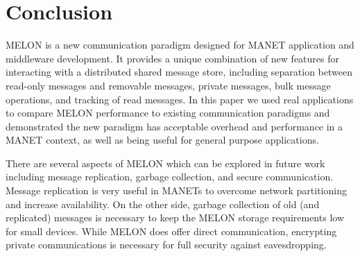 \documentclass[lnicst]{svmultln}
\begin{document}
\section{Conclusion}\label{sec:conclusion}

MELON is a new communication paradigm designed for MANET application and middleware development. It provides a unique combination of new features for interacting with a distributed shared message store, including separation between read-only messages and removable messages, private messages, bulk message operations, and tracking of read messages. In this paper we used real applications to compare MELON performance to existing communication paradigms and demonstrated the new paradigm has acceptable overhead and performance in a MANET context, as well as being useful for general purpose applications.

There are several aspects of MELON which can be explored in future work including message replication, garbage collection, and secure communication. Message replication is very useful in MANETs to overcome network partitioning and increase availability. On the other side, garbage collection of old (and replicated) messages is necessary to keep the MELON storage requirements low for small devices. While MELON does offer direct communication, encrypting private communications is necessary for full security against eavesdropping.



\end{document}
